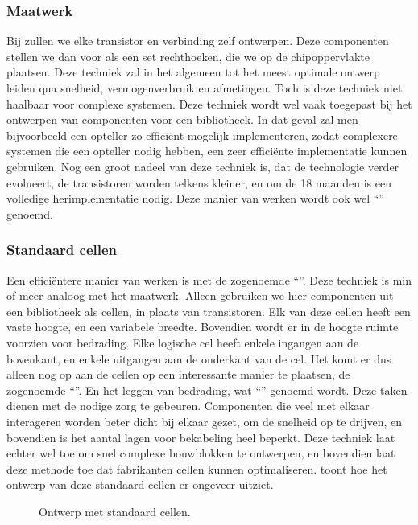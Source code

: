 \subsubsection{Maatwerk}
Bij  zullen we elke transistor en verbinding zelf ontwerpen. Deze componenten stellen we dan voor als een set rechthoeken, die we op de chipoppervlakte plaatsen. Deze techniek zal in het algemeen tot het meest optimale ontwerp leiden qua snelheid, vermogenverbruik en afmetingen. Toch is deze techniek niet haalbaar voor complexe systemen. Deze techniek wordt wel vaak toegepast bij het ontwerpen van componenten voor een bibliotheek. In dat geval zal men bijvoorbeeld een opteller zo effici\"ent mogelijk implementeren, zodat complexere systemen die een opteller nodig hebben, een zeer effici\"ente implementatie kunnen gebruiken. Nog een groot nadeel van deze techniek is, dat de technologie verder evolueert, de transistoren worden telkens kleiner, en om de 18 maanden is een volledige herimplementatie nodig. Deze manier van werken wordt ook wel ``'' genoemd.
\subsubsection{Standaard cellen}
Een effici\"entere manier van werken is met de zogenoemde ``''. Deze techniek is min of meer analoog met het maatwerk. Alleen gebruiken we hier componenten uit een bibliotheek als cellen, in plaats van transistoren. Elk van deze cellen heeft een vaste hoogte, en een variabele breedte. Bovendien wordt er in de hoogte ruimte voorzien voor bedrading. Elke logische cel heeft enkele ingangen aan de bovenkant, en enkele uitgangen aan de onderkant van de cel. Het komt er dus alleen nog op aan de cellen op een interessante manier te plaatsen, de zogenoemde ``''. En het leggen van bedrading, wat ``'' genoemd wordt. Deze taken dienen met de nodige zorg te gebeuren. Componenten die veel met elkaar interageren worden beter dicht bij elkaar gezet, om de snelheid op te drijven, en bovendien is het aantal lagen voor bekabeling heel beperkt. Deze techniek laat echter wel toe om snel complexe bouwblokken te ontwerpen, en bovendien laat deze methode toe dat fabrikanten cellen kunnen optimaliseren.  toont hoe het ontwerp van deze standaard cellen er ongeveer uitziet.
\begin{figure}[hbt]
\centering
{}
\caption{Ontwerp met standaard cellen.}
\end{figure}

